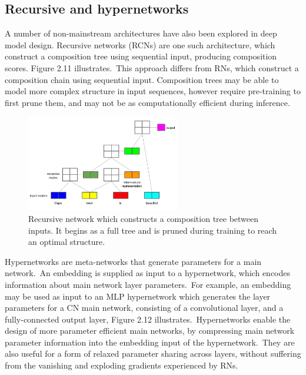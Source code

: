 \subsection{Recursive and hypernetworks} A number of non-mainstream architectures have also been explored in deep model design. Recursive networks (RCNs) are one such architecture, which construct a composition tree using sequential input, producing composition scores. Figure 2.11 illustrates.\ This approach differs from RNs, which construct a composition chain using sequential input. Composition trees may be able to model more complex structure in input sequences, however require pre-training to first prune them, and may not be as computationally efficient during inference. \par

\begin{figure}[H]
   	\centering
    	\includegraphics[width=0.6\textwidth, height=0.4\textwidth]{recursive_network.png}
	\caption{Recursive network which constructs a composition tree between inputs. It begins as a full tree and is pruned during training to reach an optimal structure.}
\end{figure}

\noindent Hypernetworks are meta-networks that generate parameters for a main network.\ An embedding is supplied as input to a hypernetwork, which encodes information about main network layer parameters.\ For example, an embedding may be used as input to an MLP hypernetwork which generates the layer parameters for a CN main network, consisting of a convolutional layer, and a fully-connected output layer, Figure 2.12 illustrates.\ Hypernetworks enable the design of more parameter efficient main networks, by compressing main network parameter information into the embedding input of the hypernetwork.\ They are also useful for a form of relaxed parameter sharing across layers, without suffering from the vanishing and exploding gradients experienced by RNs. 

